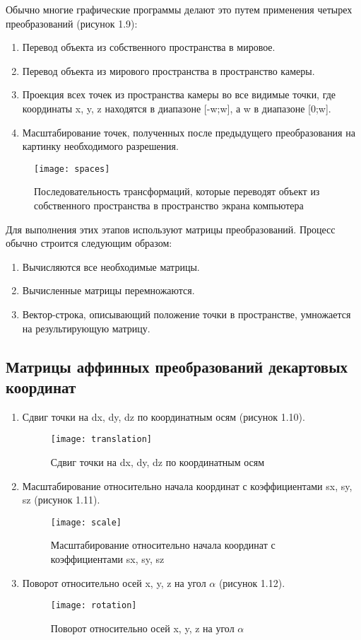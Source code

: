 \documentclass[12pt,a4paper,oneside]{report}
\begin{document}
	Обычно многие графические программы делают это путем применения четырех преобразований (рисунок 1.9):
	\begin{enumerate}
		\item Перевод объекта из собственного пространства в мировое.
		\item Перевод объекта из мирового пространства в пространство камеры.
		\item Проекция всех точек из пространства камеры во все видимые точки, где координаты x, y, z находятся в диапазоне [-w;w], а w в диапазоне [0;w].
		\item Масштабирование точек, полученных после предыдущего преобразования на картинку необходимого разрешения.
	\end{enumerate}

	\begin{figure}[H]
		\centering
		\texttt{[image: spaces]}
		\caption{Последовательность трансформаций, которые переводят объект из собственного пространства в пространство экрана компьютера}
	\end{figure}

	 Для выполнения этих этапов используют матрицы преобразований. Процесс обычно строится следующим образом:
	\begin{enumerate}
		\item Вычисляются все необходимые матрицы.
		\item Вычисленные матрицы перемножаются.
		\item Вектор-строка, описывающий положение точки в пространстве, умножается на результирующую матрицу.
	\end{enumerate}		
	
	\subsection{Матрицы аффинных преобразований декартовых координат}
	\begin{enumerate}
		\item Сдвиг точки на dx, dy, dz по координатным осям (рисунок 1.10).
		\begin{figure}[H]
			\centering
			\texttt{[image: translation]}
			\caption{Сдвиг точки на dx, dy, dz по координатным осям}
		\end{figure}
		
		\item Масштабирование относительно начала координат с коэффициентами sx, sy, sz (рисунок 1.11).
		\begin{figure}[H]
			\centering
			\texttt{[image: scale]}
			\caption{Масштабирование относительно начала координат с коэффициентами sx, sy, sz}
		\end{figure}
	
		\item Поворот относительно осей x, y, z на угол $\alpha$ (рисунок 1.12).
		\begin{figure}[H]
			\centering
			\texttt{[image: rotation]}
			\caption{Поворот относительно осей x, y, z на угол $\alpha$}
		\end{figure}
	
	\end{enumerate}
\end{document}
